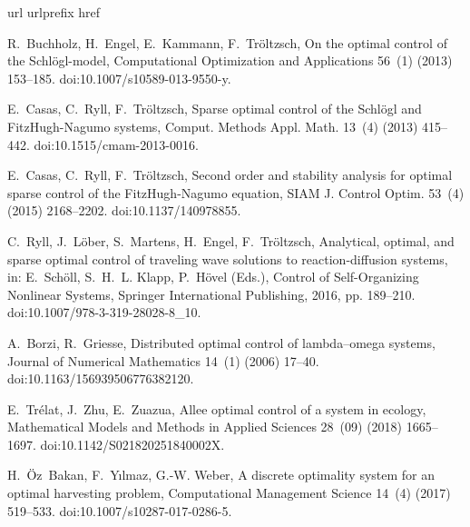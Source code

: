 \documentclass[preprint,12pt]{elsarticle}
\begin{document}
\begin{thebibliography}{10}
\expandafter\ifx\csname url\endcsname\relax
  \def\url#1{\texttt{#1}}\fi
\expandafter\ifx\csname urlprefix\endcsname\relax\def\urlprefix{URL }\fi
\expandafter\ifx\csname href\endcsname\relax
  \def\href#1#2{#2} \def\path#1{#1}\fi

R.~Buchholz, H.~Engel, E.~Kammann, F.~Tr\"oltzsch, {On the optimal control of
  the Schl\"ogl-model}, Computational Optimization and Applications 56~(1)
  (2013) 153--185.
\newblock \href {https://doi.org/10.1007/s10589-013-9550-y}
  {\path{doi:10.1007/s10589-013-9550-y}}.

E.~Casas, C.~Ryll, F.~Tr{\"o}ltzsch, Sparse optimal control of the {S}chl\"ogl
  and {F}itz{H}ugh-{N}agumo systems, Comput. Methods Appl. Math. 13~(4) (2013)
  415--442.
\newblock \href {https://doi.org/10.1515/cmam-2013-0016}
  {\path{doi:10.1515/cmam-2013-0016}}.

E.~Casas, C.~Ryll, F.~Tr{\"o}ltzsch, Second order and stability analysis for
  optimal sparse control of the {F}itz{H}ugh-{N}agumo equation, SIAM J. Control
  Optim. 53~(4) (2015) 2168--2202.
\newblock \href {https://doi.org/10.1137/140978855}
  {\path{doi:10.1137/140978855}}.

C.~Ryll, J.~L{\"o}ber, S.~Martens, H.~Engel, F.~Tr{\"o}ltzsch, Analytical,
  optimal, and sparse optimal control of traveling wave solutions to
  reaction-diffusion systems, in: E.~Sch{\"o}ll, S.~H.~L. Klapp, P.~H{\"o}vel
  (Eds.), Control of Self-Organizing Nonlinear Systems, Springer International
  Publishing, 2016, pp. 189--210.
\newblock \href {https://doi.org/10.1007/978-3-319-28028-8\_10}
  {\path{doi:10.1007/978-3-319-28028-8\_10}}.

A.~Borzi, R.~Griesse, {Distributed optimal control of lambda--omega systems},
  Journal of Numerical Mathematics 14~(1) (2006) 17--40.
\newblock \href {https://doi.org/10.1163/156939506776382120}
  {\path{doi:10.1163/156939506776382120}}.

E.~Tr\'{e}lat, J.~Zhu, E.~Zuazua, Allee optimal control of a system in ecology,
  Mathematical Models and Methods in Applied Sciences 28~(09) (2018)
  1665--1697.
\newblock \href {https://doi.org/10.1142/S021820251840002X}
  {\path{doi:10.1142/S021820251840002X}}.

H.~{\"O}z~Bakan, F.~Y{\i}lmaz, G.-W. Weber, A discrete optimality system for an
  optimal harvesting problem, Computational Management Science 14~(4) (2017)
  519--533.
\newblock \href {https://doi.org/10.1007/s10287-017-0286-5}
  {\path{doi:10.1007/s10287-017-0286-5}}.


\end{thebibliography}
\end{document}
